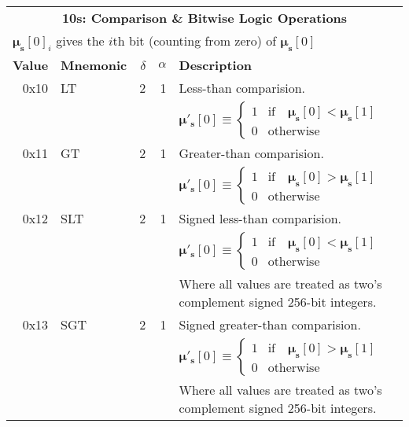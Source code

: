 \documentclass[9pt,oneside]{amsart}
\begin{document}
\begin{tabular*}{\columnwidth}[h]{rlrrl}
\toprule
\multicolumn{5}{c}{\textbf{10s: Comparison \& Bitwise Logic Operations}} \\
\multicolumn{5}{l}{$\boldsymbol{\mu}_\mathbf{s}[0]_i$ gives the $i$th bit (counting from zero) of $\boldsymbol{\mu}_\mathbf{s}[0]$} \vspace{5pt} \\
\textbf{Value} & \textbf{Mnemonic} & $\delta$ & $\alpha$ & \textbf{Description} \vspace{5pt} \\
0x10 & {\small LT} & 2 & 1 & Less-than comparision. \\
&&&& $\boldsymbol{\mu}'_\mathbf{s}[0] \equiv \begin{cases} 1 & \text{if} \quad \boldsymbol{\mu}_\mathbf{s}[0] < \boldsymbol{\mu}_\mathbf{s}[1] \\ 0 & \text{otherwise} \end{cases}$ \\
\midrule
0x11 & {\small GT} & 2 & 1 & Greater-than comparision. \\
&&&& $\boldsymbol{\mu}'_\mathbf{s}[0] \equiv \begin{cases} 1 & \text{if} \quad \boldsymbol{\mu}_\mathbf{s}[0] > \boldsymbol{\mu}_\mathbf{s}[1] \\ 0 & \text{otherwise} \end{cases}$ \\
\midrule
0x12 & {\small SLT} & 2 & 1 & Signed less-than comparision. \\
&&&& $\boldsymbol{\mu}'_\mathbf{s}[0] \equiv \begin{cases} 1 & \text{if} \quad \boldsymbol{\mu}_\mathbf{s}[0] < \boldsymbol{\mu}_\mathbf{s}[1] \\ 0 & \text{otherwise} \end{cases}$ \\
&&&& Where all values are treated as two's complement signed 256-bit integers. \\
\midrule
0x13 & {\small SGT} & 2 & 1 & Signed greater-than comparision. \\
&&&& $\boldsymbol{\mu}'_\mathbf{s}[0] \equiv \begin{cases} 1 & \text{if} \quad \boldsymbol{\mu}_\mathbf{s}[0] > \boldsymbol{\mu}_\mathbf{s}[1] \\ 0 & \text{otherwise} \end{cases}$ \\
&&&& Where all values are treated as two's complement signed 256-bit integers. \\

\end{tabular*}
\end{document}
